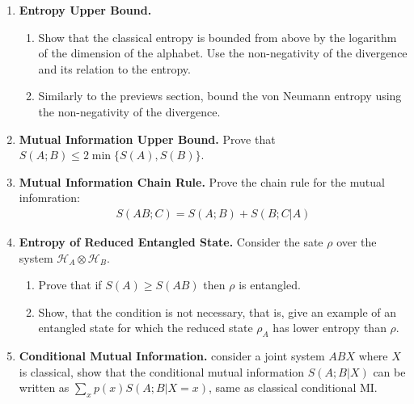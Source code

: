 \documentclass[12pt,a4paper]{article}
\begin{document}
\begin{enumerate}



  \item \textbf{Entropy Upper Bound.}

   \begin{enumerate}
     \item Show that the classical entropy is bounded from above by the logarithm of the dimension of the alphabet. Use the non-negativity of the divergence and its relation to the entropy.


    \item Similarly to the previews section, bound the von Neumann entropy using the non-negativity of the divergence.


  \end{enumerate}

  \item \textbf{Mutual Information Upper Bound.} 
     Prove that $S(A;B) \le 2\min \{S(A), S(B) \}$.




  \item \textbf{Mutual Information Chain Rule.} Prove the chain rule for the mutual infomration:
    \begin{equation*}
      \begin{split}
        S(AB;C) = S(A;B) + S(B;C|A) 
      \end{split}
    \end{equation*}


  \item \textbf{Entropy of Reduced Entangled State.} Consider the sate $\rho$ over the system $\mathcal{H}_{A} \otimes \mathcal{H}_{B}$.
    \begin{enumerate}
      \item Prove that if $S(A) \ge S(AB)$ then $\rho$ is entangled.   


      \item  Show, that the condition is not necessary, that is, give an example of an entangled state for which the reduced state $\rho_A$ has lower entropy than $\rho$. 


    \end{enumerate}


  \item \textbf{Conditional Mutual Information.} consider a joint system $ABX$ where $X$ is classical, show that the conditional mutual information $S(A;B|X)$ can be written as $\sum_x {p(x) S(A;B|X=x)}$, same as classical conditional MI.


\end{enumerate}
\end{document}

